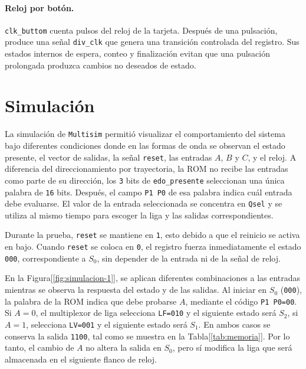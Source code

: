 \documentclass[letterpaper,12pt]{article}
\begin{document}






\paragraph{Reloj por botón.} \texttt{clk\_buttom} cuenta pulsos del reloj de la tarjeta. Después de una pulsación, produce una señal \texttt{div\_clk} que genera una transición controlada del registro. Sus estados internos de espera, conteo y finalización evitan que una pulsación prolongada produzca cambios no deseados de estado.



\section{Simulación}

La simulación de \texttt{Multisim} permitió visualizar el comportamiento del sistema bajo diferentes condiciones donde en las formas de onda se observan el estado presente, el vector de salidas, la señal \texttt{reset}, las entradas $A$, $B$ y $C$, y el reloj. A diferencia del direccionamiento por trayectoria, la ROM no recibe las entradas como parte de su dirección, los \texttt{3} bits de \texttt{edo\_presente} seleccionan una única palabra de \texttt{16} bits. Después, el campo \texttt{P1\,P0} de esa palabra indica cuál entrada debe evaluarse. El valor de la entrada seleccionada se concentra en \texttt{Qsel} y se utiliza al mismo tiempo para escoger la liga y las salidas correspondientes.

Durante la prueba, \texttt{reset} se mantiene en \texttt{1}, esto debido a que el reinicio se activa en bajo. Cuando \texttt{reset} se coloca en \texttt{0}, el registro fuerza inmediatamente el estado \texttt{000}, correspondiente a $S_0$, sin depender de la entrada ni de la señal de reloj.

En la Figura[\ref{fig:simulacion-1}], se aplican diferentes combinaciones a las entradas mientras se observa la respuesta del estado y de las salidas. Al iniciar en $S_0$ (\texttt{000}), la palabra de la ROM indica que debe probarse $A$, mediante el código \texttt{P1\,P0=00}. Si $A=0$, el multiplexor de liga selecciona \texttt{LF=010} y el siguiente estado será $S_2$, si $A=1$, selecciona \texttt{LV=001} y el siguiente estado será $S_1$. En ambos casos se conserva la salida \texttt{1100}, tal como se muestra en la Tabla[\ref{tab:memoria}]. Por lo tanto, el cambio de $A$ no altera la salida en $S_0$, pero sí modifica la liga que será almacenada en el siguiente flanco de reloj.
\end{document}
